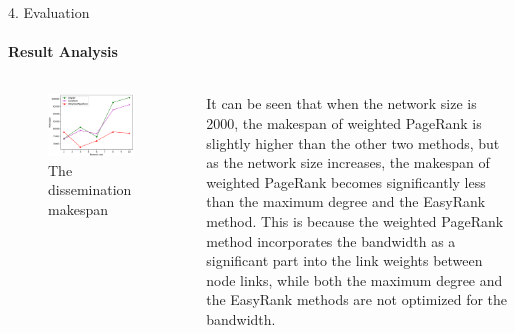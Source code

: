 \documentclass{beamer}		%
\begin{document}
\begin{frame}{4. Evaluation}
\framesubtitle{Result Analysis}
\begin{columns}
\begin{figure}
    \centering
    \includegraphics[width=0.9\textwidth]{Figure5.png}
    \caption{The dissemination makespan}
\end{figure}
It can be seen that when the network size is 2000, the makespan of weighted PageRank is slightly higher than the other two methods, but as the network size increases, the makespan of weighted PageRank becomes significantly less than the maximum degree and the EasyRank method. This is because the weighted PageRank method incorporates the bandwidth as a significant part into the link weights between node links, while both the maximum degree and the EasyRank methods are not optimized for the bandwidth.
\end{columns}
\end{frame}
\end{document}
